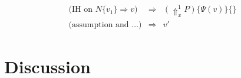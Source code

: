 \documentclass[a4paper,11pt]{article}
\begin{document}
\begin{itemize}
\begin{eqnarray*}
\mbox{(IH on $N\{v_{1}\} \Rightarrow v$)} & \Rightarrow & (\Uparrow_{x}^{1}P)\{\Psi(v)\}\{\} \\
\mbox{(assumption and \ldots)}           & \Rightarrow & v'
\end{eqnarray*}



\end{itemize}


\section{Discussion}\label{sec:discussion}
\end{document}
